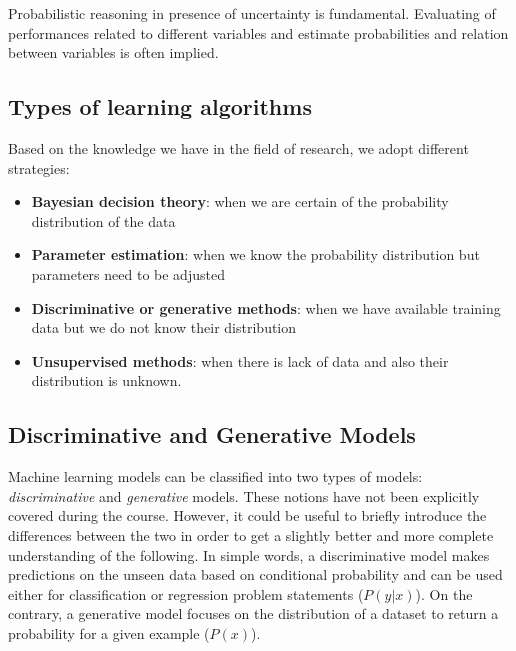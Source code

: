         
        
        Probabilistic reasoning in presence of uncertainty is fundamental. Evaluating of performances related to different variables and estimate probabilities and relation between variables is often implied.
        
    \subsection{Types of learning algorithms}
        Based on the knowledge we have in the field of research, we adopt different strategies:
        \begin{itemize}
            \item \textbf{Bayesian decision theory}: when we are certain of the probability distribution of the data
            \item \textbf{Parameter estimation}: when we know the probability distribution but parameters need to be adjusted
            \item \textbf{Discriminative or generative methods}: when we have available training data but we do not know their distribution 
            \item \textbf{Unsupervised methods}: when there is lack of data and also their distribution is unknown.
        \end{itemize}
    
    \subsection{Discriminative and Generative Models}
    Machine learning models can be classified into two types of models: \textit{discriminative} and \textit{generative} models. These notions have not been explicitly covered during the course. However, it could be useful to briefly introduce the differences between the two in order to get a slightly better and more complete understanding of the following. In simple words, a discriminative model makes predictions on the unseen data based on conditional probability and can be used either for classification or regression problem statements ($P(y | x)$). On the contrary, a generative model focuses on the distribution of a dataset to return a probability for a given example ($P(x)$).
    

